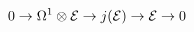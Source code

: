 \begin{equation}
\label{atiyah}
0\to \Omega^1\otimes {\cal E}\to j({\cal E})\to {\cal E}\to 0
\end{equation}

